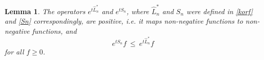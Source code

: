 \documentclass[a4paper,12pt]{article}
\newtheorem{lemma}{Lemma}[section]
\newcommand{\XX}{{\mathbb X}}
\newcommand{\R}{{\mathbb R}}
\begin{document}
%

\begin{lemma} \label{3.2}
The operators $e^{t \hat L_n^{\ast}}$ and $e^{t S_n}$, where $\hat L_n^{\ast}$ and $S_n$ were defined in \eqref{korf} and \eqref{Sn} correspondingly, are
positive, i.e. it maps non-negative functions to non-negative functions, and
\begin{equation}\label{positive}
 e^{t S_n}f \ \le \ e^{t \hat L_n^{\ast}}f
\end{equation}
for all $f \ge 0$.
\end{lemma}
\end{document}
